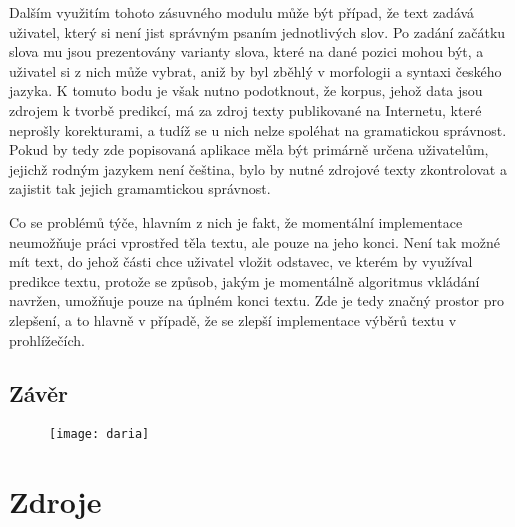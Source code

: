 \documentclass[a4paper,11pt]{article}
\begin{document}
Dalším využitím tohoto zásuvného modulu může být případ, že text zadává uživatel, který si není jist správným psaním jednotlivých slov. Po zadání začátku slova mu jsou prezentovány varianty slova, které na dané pozici mohou být, a uživatel si z nich může vybrat, aniž by byl zběhlý v morfologii a syntaxi českého jazyka. K tomuto bodu je však nutno podotknout, že korpus, jehož data jsou zdrojem k tvorbě predikcí, má za zdroj texty publikované na Internetu, které neprošly korekturami, a tudíž se u nich nelze spoléhat na gramatickou správnost. Pokud by tedy zde popisovaná aplikace měla být primárně určena uživatelům, jejichž rodným jazykem není čeština, bylo by nutné zdrojové texty zkontrolovat a zajistit tak jejich gramamtickou správnost.

Co se problémů týče, hlavním z nich je fakt, že momentální implementace neumožňuje práci vprostřed těla textu, ale pouze na jeho konci. Není tak možné mít text, do jehož části chce uživatel vložit odstavec, ve kterém by využíval predikce textu, protože se způsob, jakým je momentálně algoritmus vkládání navržen, umožňuje pouze na úplném konci textu. Zde je tedy značný prostor pro zlepšení, a to hlavně v případě, že se zlepší implementace výběrů textu v prohlížečích.


\subsection{Závěr}

\begin{figure}[h]
	\centering
	\texttt{[image: daria]}
\end{figure}
\section{Zdroje}



\end{document}
